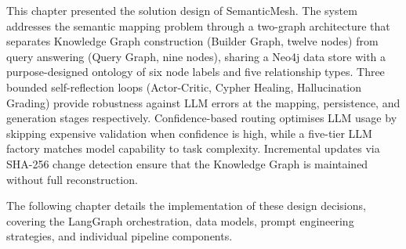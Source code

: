 This chapter presented the solution design of SemanticMesh. The system addresses the semantic mapping problem through a two-graph architecture that separates Knowledge Graph construction (Builder Graph, twelve nodes) from query answering (Query Graph, nine nodes), sharing a Neo4j data store with a purpose-designed ontology of six node labels and five relationship types. Three bounded self-reflection loops (Actor-Critic, Cypher Healing, Hallucination Grading) provide robustness against LLM errors at the mapping, persistence, and generation stages respectively. Confidence-based routing optimises LLM usage by skipping expensive validation when confidence is high, while a five-tier LLM factory matches model capability to task complexity. Incremental updates via SHA-256 change detection ensure that the Knowledge Graph is maintained without full reconstruction.

The following chapter details the implementation of these design decisions, covering the LangGraph orchestration, data models, prompt engineering strategies, and individual pipeline components.
